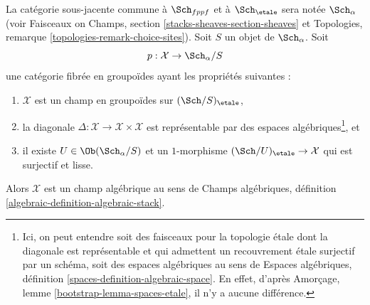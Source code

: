 \begin{lemma}
\label{lemma-stacks-etale}
La catégorie sous-jacente commune à $\Sch_{fppf}$
et à $\Sch_\etale$ sera notée $\Sch_\alpha$ (voir
Faisceaux on Champs, section \ref{stacks-sheaves-section-sheaves} et
Topologies, remarque \ref{topologies-remark-choice-sites}). Soit $S$ un objet
de $\Sch_\alpha$. Soit
$$
p : \mathcal{X} \to \Sch_\alpha/S
$$
une catégorie fibrée en groupoïdes ayant les propriétés suivantes :
\begin{enumerate}
\item $\mathcal{X}$ est un champ en groupoïdes sur $(\Sch/S)_\etale$,
\item la diagonale $\Delta : \mathcal{X} \to \mathcal{X} \times \mathcal{X}$
est représentable par des espaces algébriques\footnote{Ici, on peut entendre
soit des faisceaux pour la topologie étale dont la diagonale est représentable et qui
admettent un recouvrement étale surjectif par un schéma, soit des espaces algébriques
au sens de
Espaces algébriques, définition \ref{spaces-definition-algebraic-space}.
En effet, d'après Amorçage, lemme \ref{bootstrap-lemma-spaces-etale},
il n'y a aucune différence.}, et
\item il existe $U \in \Ob(\Sch_\alpha/S)$
et un $1$-morphisme $(\Sch/U)_\etale \to \mathcal{X}$
qui est surjectif et lisse.
\end{enumerate}
Alors $\mathcal{X}$ est un champ algébrique au sens de
Champs algébriques, définition \ref{algebraic-definition-algebraic-stack}.
\end{lemma}


